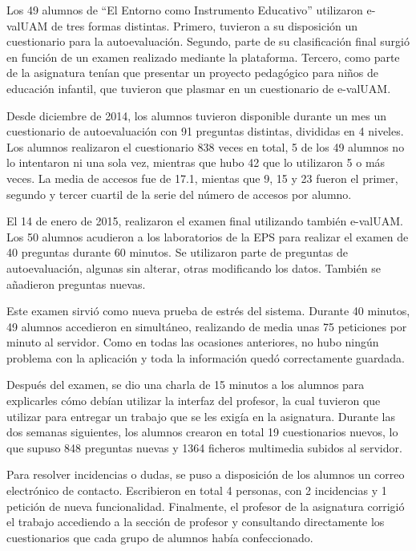 Los 49 alumnos de ``El Entorno como Instrumento Educativo'' utilizaron \acrshort{e-valUAM} de tres formas distintas. Primero, tuvieron a su disposición un cuestionario para la autoevaluación. Segundo, parte de su clasificación final surgió en función de un examen realizado mediante la plataforma. Tercero, como parte de la asignatura tenían que presentar un proyecto pedagógico para niños de educación infantil, que tuvieron que plasmar en un cuestionario de \acrshort{e-valUAM}. 

Desde diciembre de 2014, los alumnos tuvieron disponible durante un mes un cuestionario de autoevaluación con 91 preguntas distintas, divididas en 4 niveles. Los alumnos realizaron el cuestionario 838 veces en total, 5 de los 49 alumnos no lo intentaron ni una sola vez, mientras que hubo 42 que lo utilizaron 5 o más veces. La media de accesos fue de 17.1, mientas que 9, 15 y 23 fueron el primer, segundo y tercer cuartil de la serie del número de accesos por alumno.

El 14 de enero de 2015, realizaron el examen final utilizando también \acrshort{e-valUAM}. Los 50 alumnos acudieron a los laboratorios de la EPS para realizar el examen de 40 preguntas durante 60 minutos. Se utilizaron parte de preguntas de autoevaluación, algunas sin alterar, otras modificando los datos. También se añadieron preguntas nuevas.

Este examen sirvió como nueva prueba de estrés del sistema. Durante 40 minutos, 49 alumnos accedieron en simultáneo, realizando de media unas 75 peticiones por minuto al servidor. Como en todas las ocasiones anteriores, no hubo ningún problema con la aplicación y toda la información quedó correctamente guardada.

Después del examen, se dio una charla de 15 minutos a los alumnos para explicarles cómo debían utilizar la interfaz del profesor, la cual tuvieron que utilizar para entregar un trabajo que se les exigía en la asignatura. Durante las dos semanas siguientes, los alumnos crearon en total 19 cuestionarios nuevos, lo que supuso 848 preguntas nuevas y 1364 ficheros multimedia subidos al servidor. 

Para resolver incidencias o dudas, se puso a disposición de los alumnos un correo electrónico de contacto. Escribieron en total 4 personas, con 2 incidencias y 1 petición de nueva funcionalidad. Finalmente, el profesor de la asignatura corrigió el trabajo accediendo a la sección de profesor y consultando directamente los cuestionarios que cada grupo de alumnos había confeccionado.

